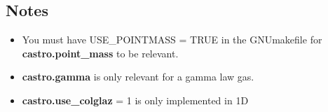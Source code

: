 \subsection{Notes}

\begin{itemize}
\item You must have USE\_POINTMASS  = TRUE in the GNUmakefile for {\bf castro.point\_mass} to be relevant.
\item {\bf castro.gamma} is only relevant for a gamma law gas.
\item {\bf castro.use\_colglaz}  = 1 is only implemented in 1D
\end{itemize}




